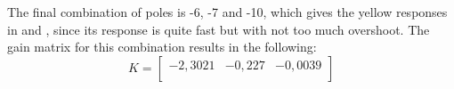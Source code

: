 The final combination of poles is -6, -7 and -10, which gives the yellow responses in  and , since its response is quite fast but with not too much overshoot. The gain matrix for this combination results in the following:
%
\begin{equation}  \label{controllerSS}
	K = 
	\begin{bmatrix}
		-2,3021 & -0,227 & -0,0039 \\
	\end{bmatrix}
\end{equation}
%